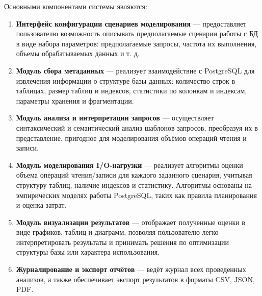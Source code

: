 

Основными компонентами системы являются:

\begin{enumerate}
\item \textbf{Интерфейс конфигурации сценариев моделирования} --- предоставляет пользователю возможность описывать предполагаемые сценарии работы с БД в виде набора параметров: предполагаемые запросы, частота их выполнения, объемы обрабатываемых данных и т. д.


\item \textbf{Модуль сбора метаданных} --- реализует взаимодействие с PostgreSQL для извлечения информации о структуре базы данных: количество строк в таблицах, размер таблиц и индексов, статистики по колонкам и индексам, параметры хранения и фрагментации.

\item \textbf{Модуль анализа и интерпретации запросов} --- осуществляет синтаксический и семантический анализ шаблонов запросов, преобразуя их в представление, пригодное для моделирования объёмов операций чтения и записи.

\item \textbf{Модуль моделирования I/O-нагрузки} --- реализует алгоритмы оценки объема операций чтения/записи для каждого заданного сценария, учитывая структуру таблиц, наличие индексов и статистику. Алгоритмы основаны на эмпирических моделях работы PostgreSQL, таких как правила планирования и оценка затрат.

\item \textbf{Модуль визуализации результатов} --- отображает полученные оценки в виде графиков, таблиц и диаграмм, позволяя пользователю легко интерпретировать результаты и принимать решения по оптимизации структуры базы или характера использования.

\item \textbf{Журналирование и экспорт отчётов} --- ведёт журнал всех проведенных анализов, а также обеспечивает экспорт результатов в форматы CSV, JSON, PDF.


\end{enumerate}

